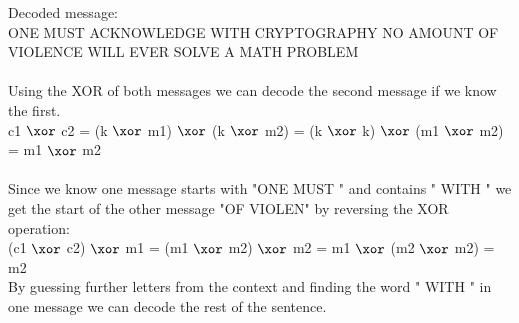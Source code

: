 Decoded message: \\
ONE MUST ACKNOWLEDGE WITH CRYPTOGRAPHY NO AMOUNT OF VIOLENCE WILL EVER SOLVE A MATH PROBLEM \\
\\
Using the XOR of both messages we can decode the second message if we know the first. \\
c1  \(\xor\) c2 = (k  \(\xor\) m1)  \(\xor\) (k  \(\xor\) m2) =  (k  \(\xor\) k)  \(\xor\) (m1  \(\xor\) m2) = m1  \(\xor\) m2  \\
\\
Since we know one message starts with "ONE MUST " and contains " WITH " we get the start of the other message "OF VIOLEN" by reversing the XOR operation: \\
(c1  \(\xor\) c2)    \(\xor\) m1 =  (m1  \(\xor\) m2)  \(\xor\) m2 =  m1  \(\xor\) (m2  \(\xor\) m2) =  m2 \\
By guessing further letters from the context and finding the word " WITH " in one message we can decode the rest of the sentence. \\

